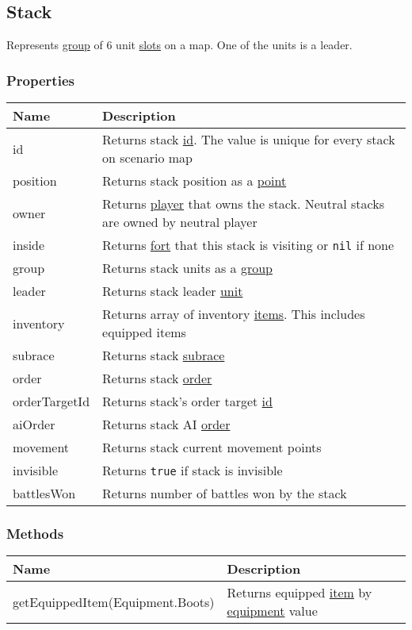 \subsection{Stack}
\label{Stack}
Represents \hyperref[Group]{group} of 6 unit \hyperref[UnitSlot]{slots} on a map. One of the units is a leader.
\subsubsection{Properties}
\begin{center}
\begin{tabularx}{\linewidth}{| l | X |}
\hline
\textbf{Name} & \textbf{Description} \\
\hline
id & Returns stack \hyperref[Id]{id}. The value is unique for every stack on scenario map\\
\hline
position & Returns stack position as a \hyperref[Point]{point}\\
\hline
owner & Returns \hyperref[Player]{player} that owns the stack. Neutral stacks are owned by neutral player\\
\hline
inside & Returns \hyperref[Fort]{fort} that this stack is visiting or \texttt{nil} if none\\
\hline
group & Returns stack units as a \hyperref[Group]{group}\\
\hline
leader & Returns stack leader \hyperref[Unit]{unit}\\
\hline
inventory & Returns array of inventory \hyperref[Item]{items}. This includes equipped items\\
\hline
subrace & Returns stack \hyperref[SubraceCategory]{subrace}\\
\hline
order & Returns stack \hyperref[OrderCategory]{order}\\
\hline
orderTargetId & Returns stack's order target \hyperref[Id]{id}\\
\hline
aiOrder & Returns stack AI \hyperref[OrderCategory]{order}\\
\hline
movement & Returns stack current movement points\\
\hline
invisible & Returns \texttt{true} if stack is invisible\\
\hline
battlesWon & Returns number of battles won by the stack\\
\hline
\end{tabularx}
\end{center}
\subsubsection{Methods}
\begin{center}
\begin{tabularx}{\linewidth}{| l | X |}
\hline
\textbf{Name} & \textbf{Description} \\
\hline
getEquippedItem(Equipment.Boots) & Returns equipped \hyperref[Item]{item} by \hyperref[EquipmentCategory]{equipment} value\\
\hline
\end{tabularx}
\end{center}